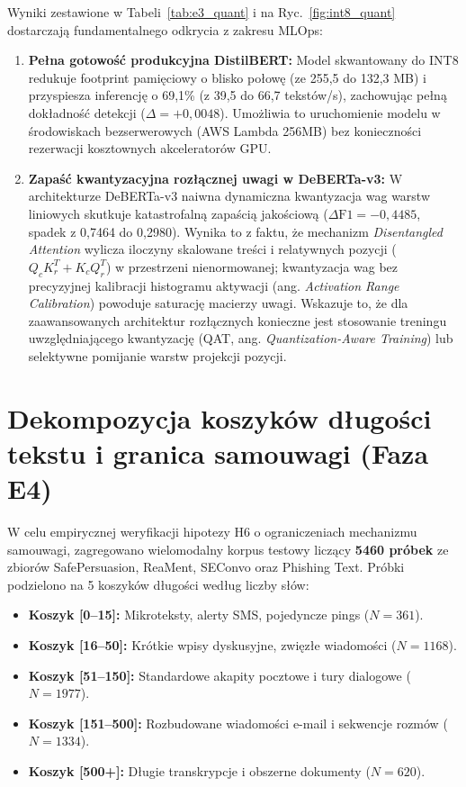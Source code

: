 \documentclass[12pt,a4paper,twoside]{report}
\begin{document}
Wyniki zestawione w Tabeli~\ref{tab:e3_quant} i na Ryc.~\ref{fig:int8_quant} dostarczają fundamentalnego odkrycia z zakresu MLOps:
\begin{enumerate}[leftmargin=*]
  \item \textbf{Pełna gotowość produkcyjna DistilBERT:} Model skwantowany do INT8 redukuje footprint pamięciowy o blisko połowę (ze 255,5 do 132,3 MB) i przyspiesza inferencję o 69,1\% (z 39,5 do 66,7 tekstów/s), zachowując pełną dokładność detekcji ($\Delta = +0,0048$). Umożliwia to uruchomienie modelu w środowiskach bezserwerowych (AWS Lambda 256MB) bez konieczności rezerwacji kosztownych akceleratorów GPU.
  \item \textbf{Zapaść kwantyzacyjna rozłącznej uwagi w DeBERTa-v3:} W architekturze DeBERTa-v3 naiwna dynamiczna kwantyzacja wag warstw liniowych skutkuje katastrofalną zapaścią jakościową ($\Delta\text{F1} = -0,4485$, spadek z 0,7464 do 0,2980). Wynika to z faktu, że mechanizm \emph{Disentangled Attention} wylicza iloczyny skalowane treści i relatywnych pozycji ($Q_c K_r^T + K_c Q_r^T$) w przestrzeni nienormowanej; kwantyzacja wag bez precyzyjnej kalibracji histogramu aktywacji (ang. \emph{Activation Range Calibration}) powoduje saturację macierzy uwagi. Wskazuje to, że dla zaawansowanych architektur rozłącznych konieczne jest stosowanie treningu uwzględniającego kwantyzację (QAT, ang. \emph{Quantization-Aware Training}) lub selektywne pomijanie warstw projekcji pozycji.
\end{enumerate}

\section{Dekompozycja koszyków długości tekstu i granica samouwagi (Faza E4)}
W celu empirycznej weryfikacji hipotezy H6 o ograniczeniach mechanizmu samouwagi, zagregowano wielomodalny korpus testowy liczący \textbf{5460 próbek} ze zbiorów SafePersuasion, ReaMent, SEConvo oraz Phishing Text. Próbki podzielono na 5 koszyków długości według liczby słów:
\begin{itemize}[leftmargin=*]
  \item \textbf{Koszyk [0--15]:} Mikroteksty, alerty SMS, pojedyncze pings ($N = 361$).
  \item \textbf{Koszyk [16--50]:} Krótkie wpisy dyskusyjne, zwięzłe wiadomości ($N = 1168$).
  \item \textbf{Koszyk [51--150]:} Standardowe akapity pocztowe i tury dialogowe ($N = 1977$).
  \item \textbf{Koszyk [151--500]:} Rozbudowane wiadomości e-mail i sekwencje rozmów ($N = 1334$).
  \item \textbf{Koszyk [500+]:} Długie transkrypcje i obszerne dokumenty ($N = 620$).
\end{itemize}
\end{document}
